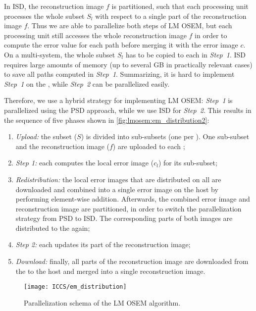 In ISD, the reconstruction image $f$ is partitioned, such that each processing unit processes the whole subset $S_l$ with respect to a single part of the reconstruction image $f$.
Thus we are able to parallelize both steps of LM OSEM, but each processing unit still accesses the whole reconstruction image $f$ in order to compute the error value for each path before merging it with the error image $c$.
On a multi-\GPU system, the whole subset $S_l$ has to be copied to each \GPU in \emph{Step~1}.
ISD requires large amounts of memory (up to several GB in practically relevant cases) to save all paths computed in \emph{Step~1}.
Summarizing, it is hard to implement \emph{Step~1} on the \GPU, while \emph{Step~2} can be parallelized easily.

Therefore, we use a hybrid strategy for implementing LM OSEM:
\emph{Step~1} is parallelized using the PSD approach, while we use ISD for \emph{Step~2}.
This results in the sequence of five phases shown in \autoref{fig:lmosem:em_distribution2}:
\begin{enumerate}
\item \emph{Upload:} the subset ($S$) is divided into sub-subsets (one per \GPU).
      One sub-subset and the reconstruction image ($f$) are uploaded to each \GPU;
\item \emph{Step 1:} each \GPU computes the local error image ($c_l$) for its sub-subset;
\item \emph{Redistribution:} the local error images that are distributed on all \GPUs are downloaded and combined into a single error image on the host by performing element-wise addition.
      Afterwards, the combined error image and reconstruction image are partitioned, in order to switch the parallelization strategy from PSD to ISD.
      The corresponding parts of both images are distributed to the \GPUs again;
\item \emph{Step 2:} each \GPU updates its part of the reconstruction image;
\item \emph{Download:} finally, all parts of the reconstruction image are downloaded from the \GPUs to the host and merged into a single reconstruction image.
\end{enumerate}

\begin{figure}
  \centering
  \texttt{[image: ICCS/em\_distribution]}
  \caption{Parallelization schema of the LM OSEM algorithm.}
  \label{fig:lmosem:em_distribution2}
\end{figure}


